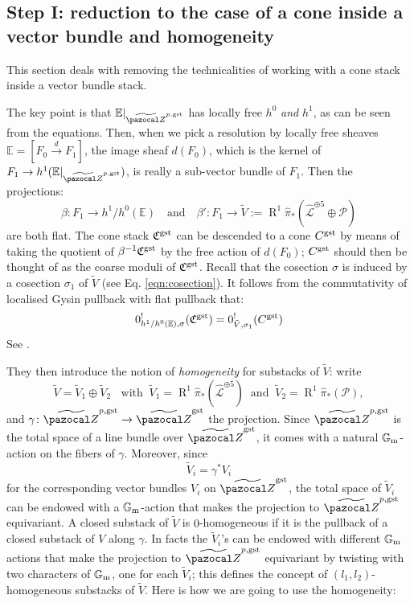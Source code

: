 \documentclass[11pt]{amsart}
\renewcommand{\to}{\rightarrow}
\newcommand{\tZ}{\widetilde{\pazocal Z}}
\newcommand{\R}{\operatorname{R}}
\newcommand{\Gm}{\mathbb{G}_{\rm{m}}}
\theoremstyle{plain}
\theoremstyle{definition}
\begin{document}
\subsection*{Step I: reduction to the case of a cone inside a vector bundle and homogeneity}
This section deals with removing the technicalities of working with a cone stack inside a vector bundle stack.

The key point is that $\mathbb E\rvert_{\tZ^{p,\rm{gst}}}$ has locally free $h^0$ \emph{and} $h^1$, as can be seen from the equations. Then, when we pick a resolution by locally free sheaves $\mathbb E=[F_0\xrightarrow{d} F_1]$, the image sheaf $d(F_0)$, which is the kernel of $F_1\to h^1(\mathbb E\rvert_{\tZ^{p,\rm{gst}}})$, is really a sub-vector bundle of $F_1$. Then the projections:
\[
 \beta\colon F_1\to h^1/h^0(\mathbb E) \quad \text{and} \quad \beta'\colon F_1\to \tilde{V}:=\R^1\hat{\pi}_*(\hat{\mathcal L}^{\oplus 5}\oplus\mathcal P)
\]
are both flat. The cone stack $\mathfrak C^{\rm{gst}}$ can be descended to a cone $C^{\rm{gst}}$ by means of taking the quotient of $\beta^{-1}\mathfrak C^{\rm{gst}}$ by the free action of $d(F_0)$; $C^{\rm{gst}}$ should then be thought of as the coarse moduli of $\mathfrak C^{\rm{gst}}$. Recall that the cosection $\sigma$ is induced by a cosection $\sigma_1$ of $\tilde V$ (see Eq. \eqref{eqn:cosection}). 
It follows from the commutativity of localised Gysin pullback with flat pullback that:
\[
 0^!_{h^1/h^0(\mathbb E),\sigma}(\mathfrak C^{\rm{gst}})= 0^!_{\tilde V,\sigma_1}(C^{\rm{gst}})
\]
See \cite[Proposition 6.3]{CLpfields}.

They then introduce the notion of \emph{homogeneity} for substacks of $\tilde V$: write 
\[\tilde V=\tilde V_1\oplus\tilde V_2\;\;\text{ with} \;\;\tilde V_1=\R^1\hat{\pi}_*(\hat{\mathcal L}^{\oplus 5})\;\; \text{and}\;\; \tilde V_2=\R^1\hat{\pi}_*(\mathcal P),\]
 and $\gamma\colon \tZ^{p,\rm{gst}}\to\tZ^{\rm{gst}}$ the projection. Since $\tZ^{p,\rm{gst}}$ is the total space of a line bundle over $\tZ^{\rm{gst}}$, it comes with a natural $\Gm$-action on the fibers of $\gamma$. Moreover, since 
 \[\tilde V_i=\gamma^*V_i\]
 for the corresponding vector bundles $V_i$ on $\tZ^{\rm{gst}}$, the total space of $\tilde V_i$ can be endowed with a $\Gm$-action that makes the projection to $\tZ^{p,\rm{gst}}$ equivariant. A closed substack of $\tilde V$ is $0$-homogeneous if it is the pullback of a closed substack of $V$ along $\gamma$. In facts the $\tilde V_i$'s can be endowed with different $\Gm$ actions that make the projection to $\tZ^{p,\rm{gst}}$ equivariant by twisting with two characters of $\Gm$, one for each $\tilde V_i$; this defines the concept of $(l_1,l_2)$-homogeneous substacks of $\tilde V$. Here is how we are going to use the homogeneity:
\end{document}
